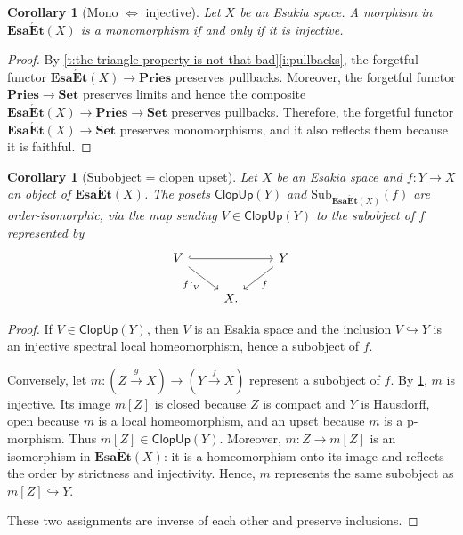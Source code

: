 \documentclass[12pt]{amsart}
\theoremstyle{plain}
\newtheorem{corollary}[theorem]{Corollary}
\theoremstyle{definition}
\newcommand{\cat}[1]{\mathbf{#1}}
\newcommand{\Set}{\cat{Set}}
\newcommand{\Pries}{\cat{Pries}}
\newcommand{\Sub}{\mathrm{Sub}}
\newcommand{\ClopUp}{\mathsf{ClopUp}}
\newcommand{\EsaEt}{\cat{Esa\acute{E}t}}
\begin{document}
\begin{corollary}[Mono $\Leftrightarrow$ injective]\label{lem: Monos are injective for spectral}
    Let $X$ be an Esakia space.
    A morphism in $\EsaEt(X)$ is a monomorphism if and only if it is injective. 
\end{corollary}
\begin{proof}
    By \cref{t:the-triangle-property-is-not-that-bad}\eqref{i:pullbacks}, the forgetful functor $\EsaEt(X) \to \Pries$  preserves pullbacks. Moreover, the forgetful functor $\Pries \to \Set$ preserves limits and hence the composite $\EsaEt(X) \to \Pries \to \Set$ preserves pullbacks. Therefore, the forgetful functor $\EsaEt(X) \to \Set$ preserves monomorphisms, and it also reflects them because it is faithful.
\end{proof}


\begin{corollary}[Subobject = clopen upset] \label{p:subobjects-EsaEt}
    Let $X$ be an Esakia space and $f \colon Y \to X$ an object of $\EsaEt(X)$.
    The posets $\ClopUp(Y)$ and $\Sub_{\EsaEt(X)}(f)$ are order-isomorphic, via the map
    sending $V\in \ClopUp(Y)$ to the subobject of $f$ represented by
    \[
        \begin{tikzcd}
            V \arrow[swap]{rd}{f{\restriction}_V} \arrow[hook]{rr} & & Y \arrow{ld}{f} \\
            & X.
        \end{tikzcd}
    \]
\end{corollary}

\begin{proof}
    If $V\in \ClopUp(Y)$, then $V$ is an Esakia space and the inclusion
    $V\hookrightarrow Y$ is an injective spectral local homeomorphism, hence a subobject
    of $f$.

    Conversely, let
    $m\colon (Z\xrightarrow{g}X)\to (Y\xrightarrow{f}X)$ represent a subobject of $f$.
    By \cref{lem: Monos are injective for spectral}, $m$ is injective. Its image
    $m[Z]$ is closed because $Z$ is compact and $Y$ is Hausdorff, open because $m$ is a
    local homeomorphism, and an upset because $m$ is a p-morphism. Thus
    $m[Z]\in \ClopUp(Y)$. Moreover, $m\colon Z\to m[Z]$ is an isomorphism in
    $\EsaEt(X)$: it is a homeomorphism onto its image and reflects the order by
    strictness and injectivity. Hence, $m$ represents the same subobject as $m[Z]\hookrightarrow Y$.

    These two assignments are inverse of each other and preserve inclusions.
\end{proof}
\end{document}
